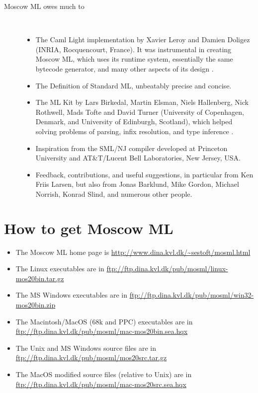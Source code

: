 \documentclass[fleqn,a4paper]{article}
\begin{document}
\begin{description}
\item[Moscow ML owes much to]\mbox{ }
\begin{itemize}
\item The Caml Light implementation by Xavier Leroy and Damien Doligez
  (INRIA, Rocquencourt, France).  It was instrumental in creating
  Moscow ML, which uses its runtime system, essentially the same
  bytecode generator, and many other aspects of its design
  \cite{Leroy:1990:TheZinc,Leroy:1993:TheCaml}.
\item The Definition of Standard ML, unbeatably precise and concise.
\item The ML Kit by Lars Birkedal, Martin Elsman, Niels Hallenberg,
  Nick Rothwell, Mads Tofte and David Turner (University of
  Copenhagen, Denmark, and University of Edinburgh, Scotland), which
  helped solving problems of parsing, infix resolution, and type
  inference \cite{Birkedal:1993:TheML}.
\item Inspiration from the SML/NJ compiler developed at Princeton
  University and AT\&T/Lucent Bell Laboratories, New Jersey,
  USA.
\item Feedback, contributions, and useful suggestions, in particular
  from Ken Friis Larsen, but also from Jonas Barklund, Mike Gordon,
  Michael Norrish, Konrad Slind, and numerous other people.
\end{itemize}
\end{description}


\section{How to get Moscow ML}
\label{sec-how-to-get}

\begin{itemize}
\item The Moscow ML home page is
        \url{http://www.dina.kvl.dk/~sestoft/mosml.html}
\item The Linux executables are in
        \url{ftp://ftp.dina.kvl.dk/pub/mosml/linux-mos20bin.tar.gz}
\item The MS Windows executables are in 
        \url{ftp://ftp.dina.kvl.dk/pub/mosml/win32-mos20bin.zip}
\item The Macintosh/MacOS (68k and PPC) executables are in\\
        \url{ftp://ftp.dina.kvl.dk/pub/mosml/mac-mos20bin.sea.hqx}
\item The Unix and MS Windows source files are in 
        \url{ftp://ftp.dina.kvl.dk/pub/mosml/mos20src.tar.gz}
\item The MacOS modified source files (relative to Unix) are in\\
        \url{ftp://ftp.dina.kvl.dk/pub/mosml/mac-mos20src.sea.hqx}
\end{itemize}
\end{document}
